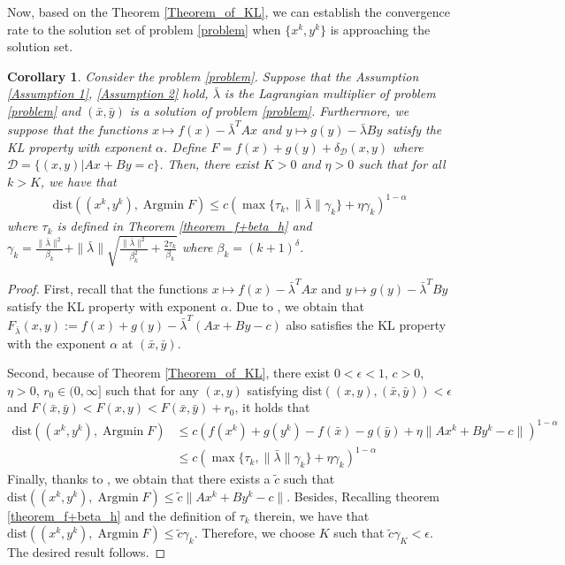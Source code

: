\documentclass{article}
\numberwithin{equation}{section}
\newtheorem{corollary}{Corollary}[theorem]
\def\Argmin{\mathop{\mathrm{Argmin}}}
\begin{document}
    Now, based on the Theorem \ref{Theorem_of_KL}, we can establish the convergence rate to the solution set 
    of problem \ref{problem} when $\{x^k,y^k\}$ is approaching the solution set. 
    \begin{corollary}
        Consider the problem \ref{problem}. Suppose that the Assumption \ref{Assumption 1}, \ref{Assumption 2} 
        hold, $\bar{\lambda}$ is the Lagrangian multiplier of problem \ref{problem} and $(\bar{x}, \bar{y})$ is a 
        solution of problem \ref{problem}. Furthermore, we suppose that 
        the functions $x \mapsto f(x) -\bar{\lambda}^TAx$ and $y\mapsto g(y)-\bar{\lambda}By$ satisfy the KL property 
        with exponent $\alpha$. 
        Define $F = f(x)+ g(y)+ \delta_{\mathcal{D}}(x,y)$ where $\mathcal{D}=\{(x,y)|Ax+By=c\}$. 
        Then, there exist $K>0$ and $\eta>0$ such that for all $k>K$, we have that   
        \begin{align}
            \mathrm{dist}\left((x^k,y^k), \Argmin F\right) \leq  c(\max \{\tau_k, \|\bar{\lambda}\rVert\gamma_k\}+\eta\gamma_k)^{1-\alpha}   \nonumber
        \end{align}
        where $\tau_k$ is defined in Theorem \ref{theorem_f+beta_h} and 
        $\gamma_k = \frac{\|\bar{\lambda}\rVert^2}{\beta_k} + \|\bar{\lambda}\rVert\sqrt{\frac{\|\bar{\lambda}\rVert^2}{\beta_k^2}+\frac{2\tau_k}{\beta_k}}$ 
        where $\beta_k = (k+1)^{\delta}$. 
    \end{corollary}
    \begin{proof}
        First, recall that the functions $x\mapsto f(x)-\bar{\lambda}^TAx$ and $y\mapsto g(y)-\bar{\lambda}^TBy$ 
        satisfy the KL property with exponent $\alpha$. Due to \cite[Theorem 3.3]{li2018calculus}, we obtain 
        that $F_{\bar{\lambda}}(x,y):= f(x)+g(y)-\bar{\lambda}^T(Ax+ By-c)$ also satisfies the 
        KL property with the exponent $\alpha$ at $(\bar{x}, \bar{y})$.  

        Second, because of Theorem \ref{Theorem_of_KL}, there exist $0<\epsilon<1$, $c>0$, $\eta>0$, $r_0 \in (0,\infty]$ such that 
        for any $(x,y)$ satisfying $\mathrm{dist}((x,y),(\bar{x},\bar{y}))<\epsilon$ and 
        $F(\bar{x},\bar{y})<F(x,y)<F(\bar{x},\bar{y})+ r_0$, it holds that 
        \begin{align}
            \mathrm{dist}\left((x^k,y^k), \Argmin F\right) &\leq  c\left(f(x^k) + g(y^k)-f(\bar{x})-g(\bar{y})+\eta\|Ax^k+By^k-c\rVert\right)^{1-\alpha} \nonumber \\
            & \leq c(\max \{\tau_k, \|\bar{\lambda}\rVert\gamma_k\}+\eta\gamma_k)^{1-\alpha} \nonumber
        \end{align}
        Finally, thanks to \cite[Lemma 3.2.3]{facchinei2003finite}, we obtain that there exists a $\tilde{c}$ 
        such that $\mathrm{dist}((x^k,y^k),\Argmin F )\leq \tilde{c}\|Ax^k+By^k -c\rVert$. Besides, 
        Recalling theorem \ref{theorem_f+beta_h} and the definition of $\tau_k$ therein, we have that 
        $\mathrm{dist}((x^k,y^k),\Argmin F )\leq \tilde{c} \gamma_k$. Therefore, we choose $K$ such that 
        $\tilde{c}\gamma_K < \epsilon$. The desired result follows. 
    \end{proof}
\end{document}

